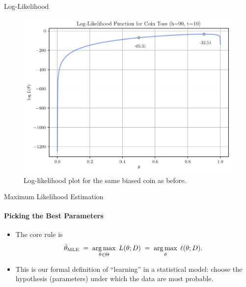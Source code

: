 \begin{frame}{Log-Likelihood}
  \begin{figure}
    \centering
    \includegraphics[height=0.65\textheight]{images/coin_toss_log_likelihood.pdf}
    \caption{Log-likelihood plot for the same biased coin as before.}
  \end{figure}
\end{frame}

\begin{frame}{Maximum Likelihood Estimation}
  \framesubtitle{Picking the Best Parameters}
  \begin{itemize}
    \item The core rule is
          \[
            \hat\theta_{\text{MLE}}
            \;=\;
            \operatorname*{arg\,max}_{\theta\in\Theta}\;L(\theta;D)
            \;=\;
            \operatorname*{arg\,max}_{\theta}\;\ell(\theta;D).
          \]
    \item This is our formal definition of “learning” in a statistical model:
          choose the hypothesis (parameters) under which the data are most probable.
  \end{itemize}
\end{frame}


